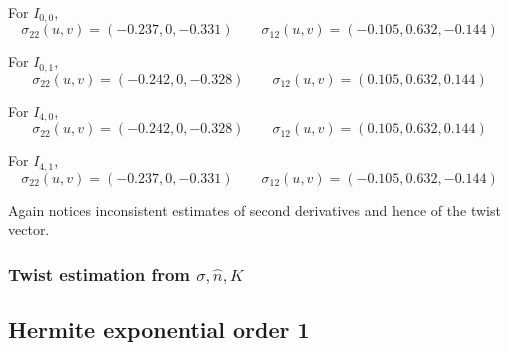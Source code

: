 \documentclass[a4paper, 11pt]{article}
\begin{document}
For $I_{0,0}$,
\begin{equation*}
\sigma_{22}(u,v) = (-0.237, 0, -0.331) \qquad \sigma_{12}(u,v) = (-0.105, 0.632, -0.144)
\end{equation*}

For $I_{0,1}$,
\begin{equation*}
\sigma_{22}(u,v) = (-0.242, 0, -0.328) \qquad \sigma_{12}(u,v) = (0.105, 0.632, 0.144)
\end{equation*}


For $I_{4,0}$,
\begin{equation*}
\sigma_{22}(u,v) = (-0.242, 0, -0.328) \qquad \sigma_{12}(u,v) = (0.105, 0.632, 0.144)
\end{equation*}

For $I_{4,1}$,
\begin{equation*}
\sigma_{22}(u,v) = (-0.237, 0, -0.331) \qquad \sigma_{12}(u,v) = (-0.105, 0.632, -0.144)
\end{equation*}

Again notices inconsistent estimates of second derivatives and hence of the twist vector.


\subsubsection{Twist estimation from $\sigma, \hat{n}, K$}

\subsection{Hermite exponential order 1}
\end{document}
